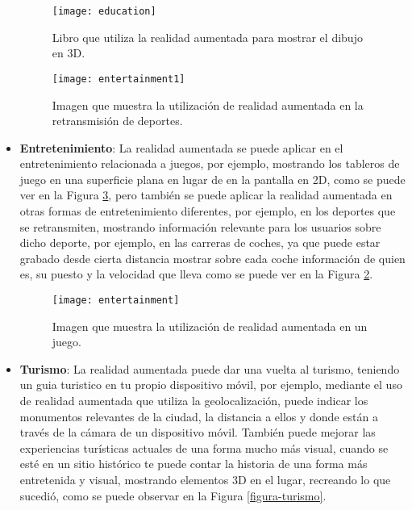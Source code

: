 \begin{itemize}
  \begin{figure}[h]
    \centering
    \texttt{[image: education]}
    \caption{Libro que utiliza la realidad aumentada para mostrar el dibujo en 3D.\protect\footnotemark}
    \label{figura-educacion}
  \end{figure}


  \begin{figure}[h]
    \centering
    \texttt{[image: entertainment1]}
    \caption{Imagen que muestra la utilización de realidad aumentada en la retransmisión de deportes. \cite{van-krevelen}}
    \label{figura-entretenimiento1}
  \end{figure}

  \item \textbf{Entretenimiento}: La realidad aumentada se puede aplicar en el entretenimiento relacionada a juegos, por ejemplo, mostrando los tableros de juego en una superficie plana en lugar de en la pantalla en 2D, como se puede ver en la Figura \ref{figura-entretenimiento}, pero también se puede aplicar la realidad aumentada en otras formas de entretenimiento diferentes, por ejemplo, en los deportes que se retransmiten, mostrando información relevante para los usuarios sobre dicho deporte, por ejemplo, en las carreras de coches, ya que puede estar grabado desde cierta distancia mostrar sobre cada coche información de quien es, su puesto y la velocidad que lleva como se puede ver en la Figura \ref{figura-entretenimiento1}. \cite{van-krevelen}

  \begin{figure}[h]
    \centering
    \texttt{[image: entertainment]}
    \caption{Imagen que muestra la utilización de realidad aumentada en un juego.\protect\footnotemark}
    \label{figura-entretenimiento}
  \end{figure}


  \item \textbf{Turismo}: La realidad aumentada puede dar una vuelta al turismo, teniendo un guia turistico en tu propio dispositivo móvil, por ejemplo, mediante el uso de realidad aumentada que utiliza la geolocalización, puede indicar los monumentos relevantes de la ciudad, la distancia a ellos y donde están a través de la cámara de un dispositivo móvil. También puede mejorar las experiencias turísticas actuales de una forma mucho más visual, cuando se esté en un sitio histórico te puede contar la historia de una forma más entretenida y visual, mostrando elementos 3D en el lugar, recreando lo que sucedió, como se puede observar en la Figura \ref{figura-turismo}. \cite{reinoso}


\end{itemize}
